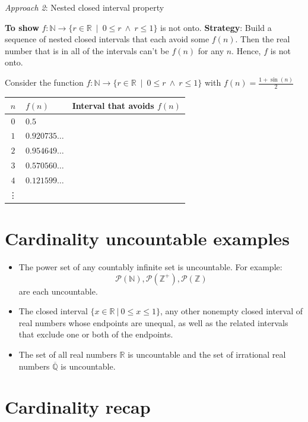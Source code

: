 \documentclass[12pt, oneside]{article}
\begin{document}
{\it Approach 2}: Nested closed interval property

{\bf To show} $f: \mathbb{N} \to \{  r \in \mathbb{R} ~\mid~ 0  \leq r ~\wedge~ r \leq 1 \}$ is not onto. 
{\bf  Strategy}: Build
a sequence of nested closed intervals that each avoid some $f(n)$.   Then  the real
number that is in all of the intervals  can't be $f(n)$ for any $n$. Hence,  $f$ is not  onto.

Consider the function $f: \mathbb{N} \to \{  r \in \mathbb{R} ~\mid~ 0 \leq r ~\wedge~ r \leq 1 \}$ with  $f(n) = \frac{1+\sin(n)}{2}$

\begin{center}
\begin{tabular}{c||p{1.65in} || p{3in} }
$n$ &  $f(n)$& Interval that avoids $f(n)$ \\
\hline
$0$ & $0.5$ &  \\
$1$ &$0.920735\ldots$  &  \\
$2$ &$0.954649\ldots$ &  \\
$3$ &$0.570560\ldots$ & \\
$4$ &$0.121599\ldots $&  \\
\vdots &  &\\
\end{tabular}
\end{center}
  \vfill
\section*{Cardinality uncountable examples}


\begin{itemize}
    \item The power set of any countably infinite set is uncountable. For example:
    \[
        \mathcal{P}(\mathbb{N}), \mathcal{P}(\mathbb{Z^+}), \mathcal{P}(\mathbb{Z})
    \]
    are each uncountable.
    \item The closed interval $\{x \in \mathbb{R} ~|~ 0 \leq x \leq 1\}$, any other nonempty closed interval of real numbers whose endpoints are 
    unequal, as well as the related intervals that exclude one or both of the endpoints.
    \item The set of all real numbers $\mathbb{R}$ is uncountable and the set of irrational
    real numbers $\overline{\mathbb{Q}}$ is uncountable.
\end{itemize} \vfill
\section*{Cardinality recap}
\end{document}
